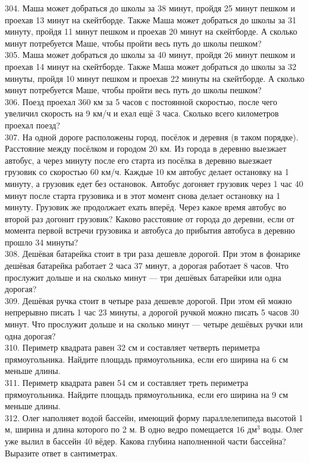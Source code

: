 \documentclass[12pt]{article}
\begin{document}
304. Маша может добраться до школы за 38 минут, пройдя 25 минут пешком и проехав 13 минут на скейтборде. Также Маша может добраться до школы за 31 минуту, пройдя 11 минут пешком и проехав 20 минут на скейтборде. А сколько минут потребуется Маше, чтобы пройти весь путь до школы пешком?\\
305. Маша может добраться до школы за 40 минут, пройдя 26 минут пешком и проехав 14 минут на скейтборде. Также Маша может добраться до школы за 32 минуты, пройдя 10 минут пешком и проехав 22 минуты на скейтборде. А сколько минут потребуется Маше, чтобы пройти весь путь до школы пешком?\\
306. Поезд проехал 360 км за 5 часов с постоянной скоростью, после чего увеличил скорость на 9 км/ч и ехал ещё 3 часа. Сколько всего километров проехал поезд?\\
307. На одной дороге расположены город, посёлок и деревня (в таком порядке). Расстояние между посёлком и городом 20 км. Из города в деревню выезжает автобус, а через минуту после его старта из посёлка в деревню выезжает грузовик со скоростью 60 км/ч. Каждые 10 км автобус делает остановку на 1 минуту, а грузовик едет без остановок. Автобус догоняет грузовик через 1 час 40 минут после старта грузовика и в этот момент снова делает остановку на 1 минуту. Грузовик же продолжает ехать вперёд. Через какое время автобус во второй раз догонит грузовик? Каково расстояние от города до деревни, если от момента первой встречи грузовика и автобуса до прибытия автобуса в деревню прошло 34 минуты?\\
308. Дешёвая батарейка стоит в три раза дешевле дорогой. При этом в фонарике дешёвая батарейка работает 2 часа 37 минут, а дорогая работает 8 часов. Что прослужит дольше и на сколько минут --- три дешёвых батарейки или одна дорогая?\\
309. Дешёвая ручка стоит в четыре раза дешевле дорогой. При этом ей можно непрерывно писать 1 час 23 минуты, а дорогой ручкой можно писать 5 часов 30 минут. Что прослужит дольше и на сколько минут --- четыре дешёвых ручки или одна дорогая?\\
310. Периметр квадрата равен 32 см и составляет четверть периметра прямоугольника. Найдите площадь прямоугольника, если его ширина на 6 см меньше длины.\\
311. Периметр квадрата равен 54 см и составляет треть периметра прямоугольника. Найдите площадь прямоугольника, если его ширина на 9 см меньше длины.\\
312. Олег наполняет водой бассейн, имеющий форму параллелепипеда высотой 1 м, ширина и длина которого по 2 м. В одно ведро помещается $16\text{ дм}^3$ воды. Олег уже вылил в бассейн 40 вёдер. Какова глубина наполненной части бассейна? Выразите ответ в сантиметрах.\\
\end{document}
